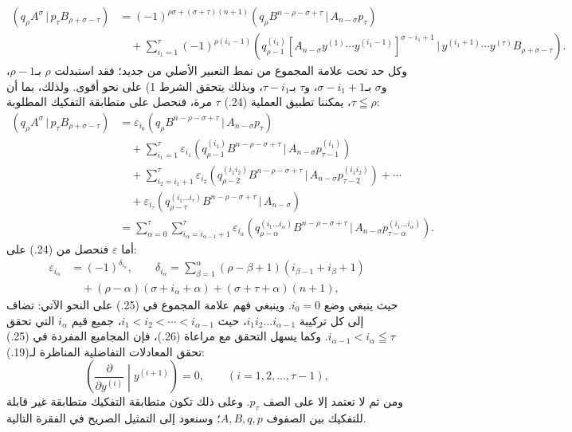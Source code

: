 \documentclass[11pt]{article}
\providecommand{\pair}[2]{(#1\,|\,#2)}
\providecommand{\eps}{\varepsilon}
\begin{document}
\begin{equation}
\begin{aligned}
\pair{q_\rho A^\sigma}{p_\tau B_{\rho+\sigma-\tau}}
&=(-1)^{\rho\sigma+(\sigma+\tau)(n+1)}
  \pair{q_\rho B^{n-\rho-\sigma+\tau}}{A_{n-\sigma}p_\tau}\\
&\quad+\sum_{i_1=1}^{\tau}(-1)^{\rho(i_1-1)}
 \pair{q_{\rho-1}^{(i_1)}[A_{n-\sigma}y^{(1)}\cdots y^{(i_1-1)}]^{\sigma-i_1+1}}
 {y^{(i_1+1)}\cdots y^{(\tau)}B_{\rho+\sigma-\tau}}.
\end{aligned}
\tag{24}
\end{equation}
وكل حد تحت علامة المجموع من نمط التعبير الأصلي من جديد؛ فقد استبدلت $\rho$ بـ$\rho-1$، و$\sigma$ بـ$\sigma-i_1+1$، و$\tau$ بـ$\tau-i_1$، وبذلك يتحقق الشرط 1) على نحو أقوى. ولذلك، بما أن $\tau\leqq\rho$، يمكننا تطبيق العملية (24.) $\tau$ مرة، فنحصل على متطابقة التفكيك المطلوبة:
\begin{equation}
\begin{aligned}
\pair{q_\rho A^\sigma}{p_\tau B_{\rho+\sigma-\tau}}
&=\eps_{i_0}\pair{q_\rho B^{n-\rho-\sigma+\tau}}{A_{n-\sigma}p_\tau}\\
&\quad+\sum_{i_1=1}^{\tau}\eps_{i_1}
 \pair{q_{\rho-1}^{(i_1)}B^{n-\rho-\sigma+\tau}}{A_{n-\sigma}p_{\tau-1}^{(i_1)}}\\
&\quad+\sum_{i_2=i_1+1}^{\tau}\eps_{i_2}
 \pair{q_{\rho-2}^{(i_1i_2)}B^{n-\rho-\sigma+\tau}}{A_{n-\sigma}p_{\tau-2}^{(i_1i_2)}}+\cdots\\
&\quad+\eps_{i_\tau}\pair{q_{\rho-\tau}^{(i_1\ldots i_\tau)}B^{n-\rho-\sigma+\tau}}{A_{n-\sigma}}\\
&=\sum_{\alpha=0}^{\tau}\sum_{i_\alpha=i_{\alpha-1}+1}^{\tau}\eps_{i_\alpha}
 \pair{q_{\rho-\alpha}^{(i_1\ldots i_\alpha)}B^{n-\rho-\sigma+\tau}}{A_{n-\sigma}p_{\tau-\alpha}^{(i_1\ldots i_\alpha)}}.
\end{aligned}
\tag{25}
\end{equation}
أما $\eps$ فنحصل من (24.) على:
\begin{equation}
\begin{aligned}
\eps_{i_\alpha}&=(-1)^{\delta_{i_\alpha}},\qquad
\delta_{i_\alpha}=\sum_{\beta=1}^{\alpha}(\rho-\beta+1)(i_{\beta-1}+i_\beta+1)\\
&\quad +(\rho-\alpha)(\sigma+i_\alpha+\alpha)+(\sigma+\tau+\alpha)(n+1),
\end{aligned}
\tag{26}
\end{equation}
حيث ينبغي وضع $i_0=0$. وينبغي فهم علامة المجموع في (25.) على النحو الآتي: تضاف إلى كل تركيبة $i_1i_2\ldots i_{\alpha-1}$، حيث $i_1<i_2<\cdots<i_{\alpha-1}$، جميع قيم $i_\alpha$ التي تحقق $i_{\alpha-1}<i_\alpha\leqq\tau$. وكما يسهل التحقق مع مراعاة (26.)، فإن المجاميع المفردة في (25.) تحقق المعادلات التفاضلية المناظرة لـ(19.):
\begin{equation}
 \left(\frac{\partial}{\partial y^{(i)}}\middle|y^{(i+1)}\right)=0,
 \qquad (i=1,2,\ldots,\tau-1),
\tag{27}
\end{equation}
ومن ثم لا تعتمد إلا على الصف $p_\tau$. وعلى ذلك تكون متطابقة التفكيك متطابقة غير قابلة للتفكيك بين الصفوف $A,B,q,p$؛ وسنعود إلى التمثيل الصريح في الفقرة التالية.
\end{document}
